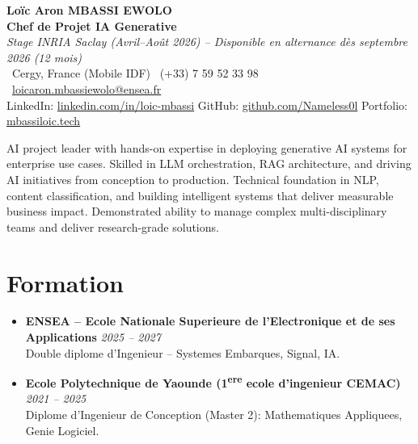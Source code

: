 \documentclass[a4paper,11pt]{article}
\begin{document}
\begin{center}
    {\Large \textbf{Lo\"ic Aron MBASSI EWOLO}} \\ \vspace{4pt}
    \textbf{\large Chef de Projet IA Generative} \\
    \textit{\small Stage INRIA Saclay (Avril--Ao\^ut 2026) -- Disponible en alternance d\`es septembre 2026 (12 mois)} \\ \vspace{4pt}
    \small
    \Pointinghand\ Cergy, France (Mobile IDF) \quad
    \Mobilefone\ (+33) 7 59 52 33 98 \quad
    {\color{primary}\Letter\ \href{mailto:loicaron.mbassiewolo@ensea.fr}{loicaron.mbassiewolo@ensea.fr}} \\ \vspace{2pt}
    {\color{primary}LinkedIn: \href{https://www.linkedin.com/in/loic-mbassi/}{linkedin.com/in/loic-mbassi}} \quad
    {\color{primary}GitHub: \href{https://github.com/Nameless0l}{github.com/Nameless0l}} \quad
    {\color{primary}Portfolio: \href{https://mbassiloic.tech}{mbassiloic.tech}}
\end{center}
\vspace{-6pt}

\noindent\small{AI project leader with hands-on expertise in deploying generative AI systems for enterprise use cases. Skilled in LLM orchestration, RAG architecture, and driving AI initiatives from conception to production. Technical foundation in NLP, content classification, and building intelligent systems that deliver measurable business impact. Demonstrated ability to manage complex multi-disciplinary teams and deliver research-grade solutions.}

\section{Formation}
\begin{itemize}[leftmargin=*, label=\tiny$\bullet$, nosep]
    \item \textbf{ENSEA -- Ecole Nationale Superieure de l'Electronique et de ses Applications} \hfill \textit{2025 -- 2027} \\
    \small{Double diplome d'Ingenieur -- Systemes Embarques, Signal, IA.}
    \item \textbf{Ecole Polytechnique de Yaounde (1\textsuperscript{ere} ecole d'ingenieur CEMAC)} \hfill \textit{2021 -- 2025} \\
    \small{Diplome d'Ingenieur de Conception (Master 2): Mathematiques Appliquees, Genie Logiciel.}
\end{itemize}
\end{document}
